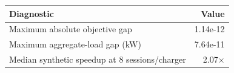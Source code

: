 \begin{tabular}{lr}
\toprule
Diagnostic & Value \\
\midrule
Maximum absolute objective gap & 1.14e-12 \\
Maximum aggregate-load gap (kW) & 7.64e-11 \\
Median synthetic speedup at 8 sessions/charger & 2.07$\times$ \\
\bottomrule
\end{tabular}
